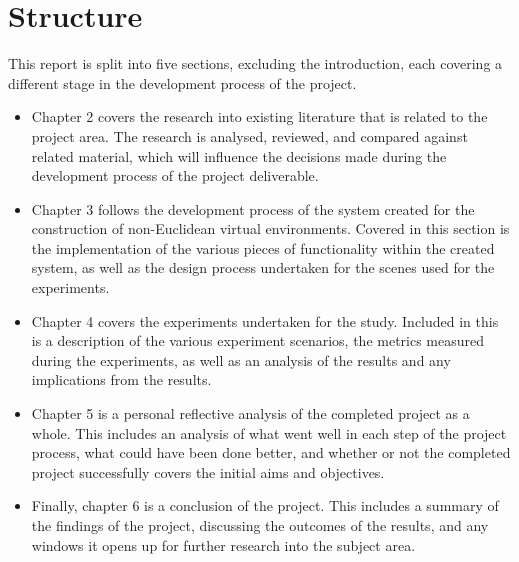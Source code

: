 	\section{Structure}

		This report is split into five sections, excluding the introduction, each covering a different stage in the development process of the project.

		\begin{itemize}
			\item Chapter 2 covers the research into existing literature that is related to the project area.
			The research is analysed, reviewed, and compared against related material, which will influence the decisions made during the development process of the project deliverable.

			\item Chapter 3 follows the development process of the system created for the construction of non-Euclidean virtual environments.
			Covered in this section is the implementation of the various pieces of functionality within the created system, as well as the design process undertaken for the scenes used for the experiments.

			\item Chapter 4 covers the experiments undertaken for the study.
			Included in this is a description of the various experiment scenarios, the metrics measured during the experiments, as well as an analysis of the results and any implications from the results.

			\item Chapter 5 is a personal reflective analysis of the completed project as a whole.
			This includes an analysis of what went well in each step of the project process, what could have been done better, and whether or not the completed project successfully covers the initial aims and objectives.

			\item Finally, chapter 6 is a conclusion of the project.
			This includes a summary of the findings of the project, discussing the outcomes of the results, and any windows it opens up for further research into the subject area.
		\end{itemize}

